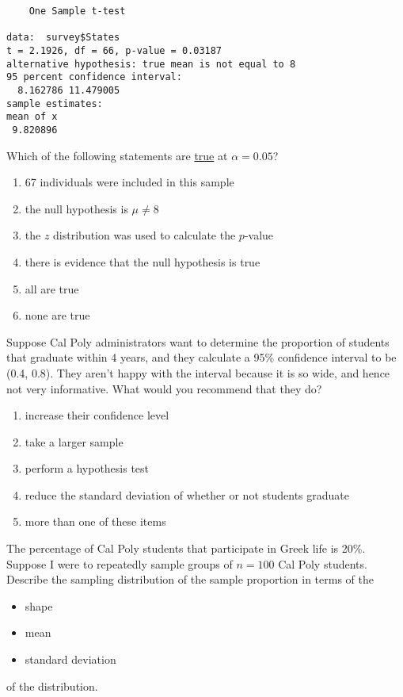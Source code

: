 \begin{frame}[fragile]
\begin{verbatim}
	One Sample t-test

data:  survey$States
t = 2.1926, df = 66, p-value = 0.03187
alternative hypothesis: true mean is not equal to 8
95 percent confidence interval:
  8.162786 11.479005
sample estimates:
mean of x
 9.820896
\end{verbatim}
\begin{clicker}{Which of the following statements are \underline{true} at $\alpha=0.05$?}
\begin{enumerate}
    \item
    67 individuals were included in this sample
    \item
    the null hypothesis is $\mu\neq 8$
    \item
    the $z$ distribution was used to calculate the $p$-value
    \item
    there is evidence that the null hypothesis is true
    \item
    all are true
    \item
    none are true
\end{enumerate}
\end{clicker}
\end{frame}

\begin{frame}
\begin{clicker}{Suppose Cal Poly administrators want to determine the proportion of students that graduate within 4 years, and they calculate a 95\% confidence interval to be (0.4, 0.8).  They aren't happy with the interval because it is so wide, and hence not very informative.  What would you recommend that they do?}
\begin{enumerate}
    \item
    increase their confidence level
    \item
    take a larger sample
    \item
    perform a hypothesis test
    \item
    reduce the standard deviation of whether or not students graduate
    \item
    more than one of these items
\end{enumerate}
\end{clicker}
\end{frame}

\begin{frame}
The percentage of Cal Poly students that participate in Greek life is 20\%.  Suppose I were to repeatedly sample groups of $n=100$ Cal Poly students.  Describe the sampling distribution of the sample proportion in terms of the
\begin{itemize}
    \item
    shape
    \item
    mean
    \item
    standard deviation
\end{itemize}
of the distribution.
\end{frame}




